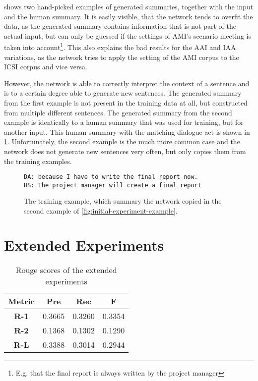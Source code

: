  shows two hand-picked examples of generated summaries, together with the input and the human summary.
It is easily visible, that the network tends to overfit the data, as the generated summary contains information that is not part of the actual input, but can only be guessed if the settings of AMI's scenario meeting is taken into account\footnote{E.g. that the final report is always written by the project manager}.
This also explains the bad results for the AAI and IAA variations, as the network tries to apply the setting of the AMI corpus to the ICSI corpus and vice versa.

However, the network is able to correctly interpret the context of a sentence and is to a certain degree able to generate new sentences.
The generated summary from the first example is not present in the training data at all, but constructed from multiple different sentences.
The generated summary from the second example is identically to a human summary that was used for training, but for another input.
This human summary with the matching dialogue act is shown in \cref{fig:initial-experiment-training-example}.
Unfortunately, the second example is the much more common case and the network does not generate new sentences very often, but only copies them from the training examples.

\begin{figure}[h]
\begin{lstlisting}[numbers=none]
DA: because I have to write the final report now.
HS: The project manager will create a final report
\end{lstlisting}
\caption{The training example, which summary the network copied in the second example of \cref{fig:initial-experiment-example}.}
\label{fig:initial-experiment-training-example}
\end{figure}


\section{Extended Experiments}

\begin{table}[h]
\centering
\begin{tabular}{@{}clll@{}}
\toprule
\textbf{Metric} & \multicolumn{1}{c}{\textbf{Pre}} & \multicolumn{1}{c}{\textbf{Rec}} & \multicolumn{1}{c}{\textbf{F}} \\ \midrule
\textbf{R-1}    & 0.3665                           & 0.3260                           & 0.3354                         \\
\textbf{R-2}    & 0.1368                           & 0.1302                           & 0.1290                         \\
\textbf{R-L}    & 0.3388                           & 0.3014                           & 0.2944                         \\ \bottomrule
\end{tabular}
\caption{Rouge scores of the extended experiments}
\label{tab:extended-experiment-rouge}
\end{table}

